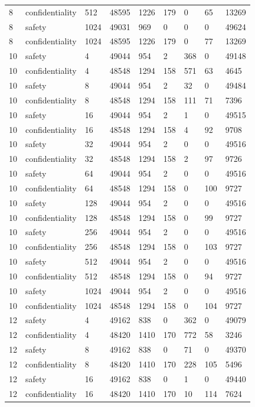 \documentclass[10pt]{article}
\begin{document}
\begin{landscape}
\begin{longtable}{lllllllll}
8 & confidentiality & 512 & 48595 & 1226 & 179 & 0 & 65 & 13269\\
8 & safety & 1024 & 49031 & 969 & 0 & 0 & 0 & 49624\\
8 & confidentiality & 1024 & 48595 & 1226 & 179 & 0 & 77 & 13269\\
10 & safety & 4 & 49044 & 954 & 2 & 368 & 0 & 49148\\
10 & confidentiality & 4 & 48548 & 1294 & 158 & 571 & 63 & 4645\\
10 & safety & 8 & 49044 & 954 & 2 & 32 & 0 & 49484\\
10 & confidentiality & 8 & 48548 & 1294 & 158 & 111 & 71 & 7396\\
10 & safety & 16 & 49044 & 954 & 2 & 1 & 0 & 49515\\
10 & confidentiality & 16 & 48548 & 1294 & 158 & 4 & 92 & 9708\\
10 & safety & 32 & 49044 & 954 & 2 & 0 & 0 & 49516\\
10 & confidentiality & 32 & 48548 & 1294 & 158 & 2 & 97 & 9726\\
10 & safety & 64 & 49044 & 954 & 2 & 0 & 0 & 49516\\
10 & confidentiality & 64 & 48548 & 1294 & 158 & 0 & 100 & 9727\\
10 & safety & 128 & 49044 & 954 & 2 & 0 & 0 & 49516\\
10 & confidentiality & 128 & 48548 & 1294 & 158 & 0 & 99 & 9727\\
10 & safety & 256 & 49044 & 954 & 2 & 0 & 0 & 49516\\
10 & confidentiality & 256 & 48548 & 1294 & 158 & 0 & 103 & 9727\\
10 & safety & 512 & 49044 & 954 & 2 & 0 & 0 & 49516\\
10 & confidentiality & 512 & 48548 & 1294 & 158 & 0 & 94 & 9727\\
10 & safety & 1024 & 49044 & 954 & 2 & 0 & 0 & 49516\\
10 & confidentiality & 1024 & 48548 & 1294 & 158 & 0 & 104 & 9727\\
12 & safety & 4 & 49162 & 838 & 0 & 362 & 0 & 49079\\
12 & confidentiality & 4 & 48420 & 1410 & 170 & 772 & 58 & 3246\\
12 & safety & 8 & 49162 & 838 & 0 & 71 & 0 & 49370\\
12 & confidentiality & 8 & 48420 & 1410 & 170 & 228 & 105 & 5496\\
12 & safety & 16 & 49162 & 838 & 0 & 1 & 0 & 49440\\
12 & confidentiality & 16 & 48420 & 1410 & 170 & 10 & 114 & 7624\\

\end{longtable}
\end{landscape}
\end{document}

